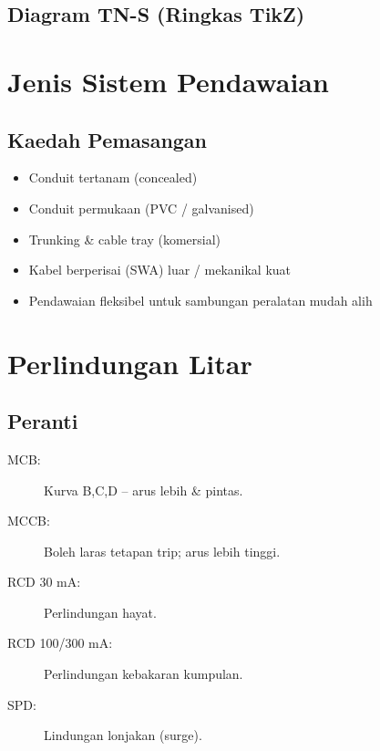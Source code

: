 \documentclass[12pt,a4paper,oneside]{scrreprt}
\newcommand{\Lwire}{\textcolor{LiveColor}{L}}
\newcommand{\Nwire}{\textcolor{NeutralColor}{N}}
\newcommand{\Ewire}{\textcolor{EarthColor}{E}}
\begin{document}
\section{Diagram TN-S (Ringkas TikZ)}

\chapter{Jenis Sistem Pendawaian}
\section{Kaedah Pemasangan}
\begin{itemize}
  \item Conduit tertanam (concealed)
  \item Conduit permukaan (PVC / galvanised)
  \item Trunking \& cable tray (komersial)
  \item Kabel berperisai (SWA) luar / mekanikal kuat
  \item Pendawaian fleksibel untuk sambungan peralatan mudah alih
\end{itemize}

\chapter{Perlindungan Litar}
\section{Peranti}
\begin{description}
  \item[MCB:] Kurva B,C,D – arus lebih \& pintas.
  \item[MCCB:] Boleh laras tetapan trip; arus lebih tinggi.
  \item[RCD 30 mA:] Perlindungan hayat.
  \item[RCD 100/300 mA:] Perlindungan kebakaran kumpulan.
  \item[SPD:] Lindungan lonjakan (surge).
\end{description}
\end{document}

